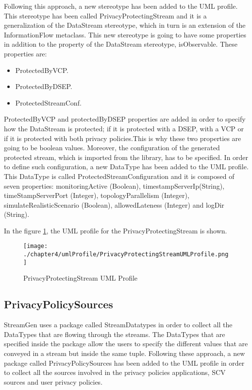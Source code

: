 Following this approach, a new stereotype has been added to the UML profile. This stereotype has been called PrivacyProtectingStream and it is a generalization of the DataStream stereotype, which in turn is an extension of the InformationFlow metaclass. This new stereotype is going to have some properties in addition to the property of the DataStream stereotype, isObservable. These properties are:

\begin{itemize}
\item ProtectedByVCP.
\item ProtectedByDSEP.
\item ProtectedStreamConf.
\end{itemize}

ProtectedByVCP and protectedByDSEP properties are added in order to specify how the DataStream is protected; if it is protected with a DSEP, with a VCP or if it is protected with both privacy policies.This is why these two properties are going to be boolean values. Moreover, the configuration of the generated protected stream, which is imported from the library, has to be specified. In order to define such configuration, a new DataType has been added to the UML profile. This DataType is called ProtectedStreamConfiguration and it is composed of seven properties: monitoringActive (Boolean), timestampServerIp(String), timeStampServerPort (Integer), topologyParallelism (Integer), simulateRealisticScenario (Boolean), allowedLateness (Integer) and logDir (String).

In the figure \ref{fig:PrivacyProtectingStream UML Profile}, the UML profile for the PrivacyProtectingStream is shown.

\begin{figure}
\centering
{\texttt{[image: ./chapter4/umlProfile/PrivacyProtectingStreamUMLProfile.png]}}
\caption{PrivacyProtectingStream UML Profile}
\label{fig:PrivacyProtectingStream UML Profile}
\end{figure}

\subsection{PrivacyPolicySources} %

StreamGen uses a package called StreamDatatypes in order to collect all the DataTypes that are flowing through the streams. The DataTypes that are specified inside the package allow the users to specify the different values that are conveyed in a stream but inside the same tuple. Following these approach, a new package called PrivacyPolicySources has been added to the UML profile in order to collect all the sources involved in the privacy policies applications, SCV sources and user privacy policies.

